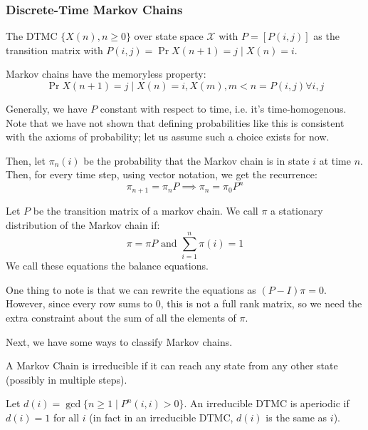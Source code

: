 \subsubsection{Discrete-Time Markov Chains}

\begin{definition}
    The DTMC $\{X(n), n \geq 0\}$ over state space $\mathcal{X}$ with $P = [P(i,j)]$ as the transition matrix
    with $P(i, j) = \Pr{X(n + 1) = j \mid X(n) = i}$.

    Markov chains have the memoryless property:
    \[\Pr{X(n + 1) = j \mid X(n) = i, X(m), m < n} = P(i, j) \forall i, j \]
\end{definition}

Generally, we have $P$ constant with respect to time, i.e. it's time-homogenous.
Note that we have not shown that defining probabilities like this is
consistent with the axioms of probability; let us assume such a choice exists for now.

Then, let $\pi_n(i)$ be the probability that the
Markov chain is in state $i$ at time $n$. Then, for every time step,
using vector notation, we get the recurrence:
\[ \pi_{n + 1} = \pi_n P \implies \pi_n = \pi_0 P^n \]

\begin{definition}
    Let $P$ be the transition matrix of a markov chain. We call $\pi$ a stationary distribution
    of the Markov chain if:
    \[\pi = \pi P \text{ and } \sum_{i = 1}^n \pi(i) = 1\]
    We call these equations the balance equations.
\end{definition}

One thing to note is that we can rewrite the equations as $(P - I) \pi = 0$. However,
since every row sums to 0, this is not a full rank matrix, so we need the extra constraint about
the sum of all the elements of $\pi$.

Next, we have some ways to classify Markov chains.

\begin{definition}[Irreducible]
    A Markov Chain is irreducible if it can reach any state from any other state (possibly in multiple steps).
\end{definition}

\begin{definition}[Aperiodic]
    Let $d(i) = \gcd\{n \geq 1 \mid P^n(i, i) > 0\}$. An irreducible DTMC is aperiodic if $d(i) = 1$ for all $i$
    (in fact in an irreducible DTMC, $d(i)$ is the same as $i$).
\end{definition}

